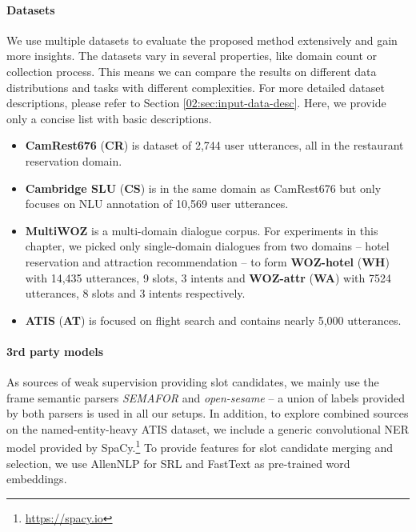 \paragraph{Datasets}
We use multiple datasets to evaluate the proposed method extensively and gain more insights.
The datasets vary in several properties, like domain count or collection process.
This means we can compare the results on different data distributions and tasks with different complexities.
For more detailed dataset descriptions, please refer to Section \ref{02:sec:input-data-desc}.
Here, we provide only a concise list with basic descriptions.
\begin{itemize}
    \item \textbf{CamRest676} (\textbf{CR}) is dataset of 2,744 user utterances, all in the restaurant reservation domain.
    \item \textbf{Cambridge SLU} (\textbf{CS}) is in the same domain as CamRest676 but only focuses on NLU annotation of  10,569 user utterances.
    \item \textbf{MultiWOZ} is a multi-domain dialogue corpus. For experiments in this chapter, we picked only single-domain dialogues from two domains -- hotel reservation and attraction recommendation -- to form \textbf{WOZ-hotel} (\textbf{WH}) with 14,435 utterances, 9 slots, 3 intents and \textbf{WOZ-attr} (\textbf{WA}) with 7524 utterances, 8 slots and 3 intents respectively.
    \item \textbf{ATIS} (\textbf{AT}) is focused on flight search and contains nearly 5,000 utterances.
\end{itemize}
\paragraph{3rd party models}
As sources of weak supervision providing slot candidates, we mainly use the frame semantic parsers \textit{SEMAFOR} \cite{das2010semafor} and \textit{open-sesame} \cite{swayamdipta2017frame} -- a union of labels provided by both parsers is used in all our setups. In addition, to explore combined sources on the named-entity-heavy ATIS dataset, we include a generic convolutional NER model provided by SpaCy.\footnote{\url{https://spacy.io}}
To provide features for slot candidate merging and selection, we use AllenNLP \cite{Gardner2017AllenNLP} for SRL
and FastText \cite{bojanowski2017enriching} as pre-trained word embeddings.


